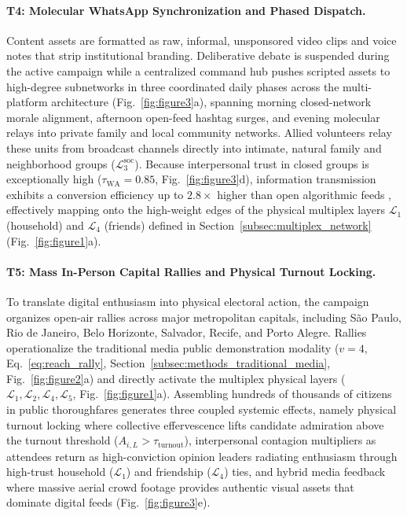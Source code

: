 \documentclass{article}
\begin{document}
\paragraph{T4: Molecular WhatsApp Synchronization and Phased Dispatch.}
Content assets are formatted as raw, informal, unsponsored video clips and voice notes that strip institutional branding. Deliberative debate is suspended during the active campaign while a centralized command hub pushes scripted assets to high-degree subnetworks in three coordinated daily phases across the multi-platform architecture (Fig.~\ref{fig:figure3}a), spanning morning closed-network morale alignment, afternoon open-feed hashtag surges, and evening molecular relays into private family and local community networks. Allied volunteers relay these units from broadcast channels directly into intimate, natural family and neighborhood groups ($\mathcal{L}_3^{\mathrm{soc}}$). Because interpersonal trust in closed groups is exceptionally high ($\tau_{\mathrm{WA}} = 0.85$, Fig.~\ref{fig:figure3}d), information transmission exhibits a conversion efficiency up to $2.8\times$ higher than open algorithmic feeds \citep{resende2019whatsapp}, effectively mapping onto the high-weight edges of the physical multiplex layers $\mathcal{L}_1$ (household) and $\mathcal{L}_4$ (friends) defined in Section~\ref{subsec:multiplex_network} (Fig.~\ref{fig:figure1}a).

\paragraph{T5: Mass In-Person Capital Rallies and Physical Turnout Locking.}
To translate digital enthusiasm into physical electoral action, the campaign organizes open-air rallies across major metropolitan capitals, including S{\~a}o Paulo, Rio de Janeiro, Belo Horizonte, Salvador, Recife, and Porto Alegre. Rallies operationalize the traditional media public demonstration modality ($v=4$, Eq.~\eqref{eq:reach_rally}, Section~\ref{subsec:methods_traditional_media}, Fig.~\ref{fig:figure2}a) and directly activate the multiplex physical layers ($\mathcal{L}_1, \mathcal{L}_2, \mathcal{L}_4, \mathcal{L}_5$, Fig.~\ref{fig:figure1}a). Assembling hundreds of thousands of citizens in public thoroughfares generates three coupled systemic effects, namely physical turnout locking where collective effervescence lifts candidate admiration above the turnout threshold ($A_{i,L} > \tau_{\mathrm{turnout}}$), interpersonal contagion multipliers as attendees return as high-conviction opinion leaders radiating enthusiasm through high-trust household ($\mathcal{L}_1$) and friendship ($\mathcal{L}_4$) ties, and hybrid media feedback where massive aerial crowd footage provides authentic visual assets that dominate digital feeds (Fig.~\ref{fig:figure3}e).
\end{document}
